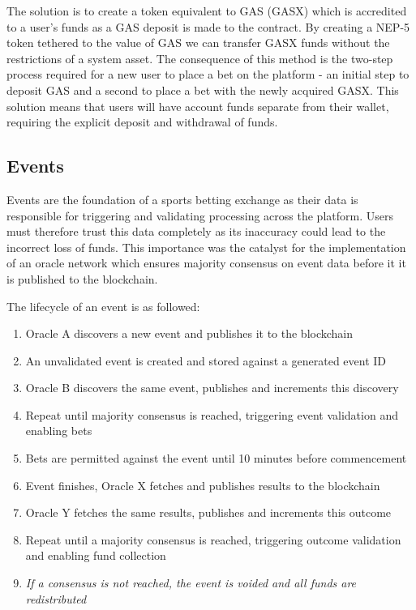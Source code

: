 \documentclass{article}
\begin{document}
The solution is to create a token equivalent to GAS (GASX) which is accredited to a user’s funds as a GAS deposit is made to the contract. By creating a NEP-5 token tethered to the value of GAS we can transfer GASX funds without the restrictions of a system asset. The consequence of this method is the two-step process required for a new user to place a bet on the platform - an initial step to deposit GAS and a second to place a bet with the newly acquired GASX. This solution means that users will have account funds separate from their wallet, requiring the explicit deposit and withdrawal of funds.

	
	\subsection{Events}
Events are the foundation of a sports betting exchange as their data is responsible for triggering and validating processing across the platform. Users must therefore trust this data completely as its inaccuracy could lead to the incorrect loss of funds. This importance was the catalyst for the implementation of an oracle network which ensures majority consensus on event data before it it is published to the blockchain.

The lifecycle of an event is as followed:
\begin{enumerate}
	\item Oracle A discovers a new event and publishes it to the blockchain
	\item An unvalidated event is created and stored against a generated event ID
	\item Oracle B discovers the same event, publishes and increments this discovery
	\item Repeat until majority consensus is reached, triggering event validation and enabling bets
	\item Bets are permitted against the event until 10 minutes before commencement
	\item Event finishes, Oracle X fetches and publishes results to the blockchain
	\item Oracle Y fetches the same results, publishes and increments this outcome
	\item Repeat until a majority consensus is reached, triggering outcome validation and enabling fund collection
	\item \it{If a consensus is not reached, the event is voided and all funds are redistributed}
\end{enumerate}
\end{document}
